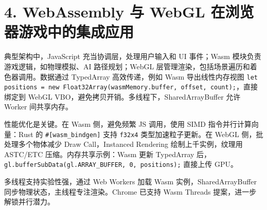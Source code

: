\chapter{4. WebAssembly 与 WebGL 在浏览器游戏中的集成应用}
典型架构中，JavaScript 充当协调层，处理用户输入和 UI 事件；Wasm 模块负责游戏逻辑，如物理模拟、AI 路径规划；WebGL 层管理渲染，包括场景遍历和着色器调用。数据通过 TypedArray 高效传递，例如 Wasm 导出线性内存视图 \texttt{let positions = new Float32Array(wasmMemory.buffer, offset, count);}，直接绑定到 WebGL VBO，避免拷贝开销。多线程下，SharedArrayBuffer 允许 Worker 间共享内存。\par
性能优化是关键。在 Wasm 侧，避免频繁 JS 调用，使用 SIMD 指令并行计算向量：Rust 的 \texttt{\#{}[wasm\_{}bindgen]} 支持 \texttt{f32x4} 类型加速粒子更新。在 WebGL 侧，批处理多个物体减少 Draw Call，Instanced Rendering 绘制上千实例，纹理用 ASTC/ETC 压缩。内存共享示例：Wasm 更新 TypedArray 后，\texttt{gl.bufferSubData(gl.ARRAY\_{}BUFFER, 0, positions);} 直接上传 GPU。\par
多线程支持实验性强，通过 Web Workers 加载 Wasm 实例，SharedArrayBuffer 同步物理状态，主线程专注渲染。Chrome 已支持 Wasm Threads 提案，进一步解锁并行潜力。\par
